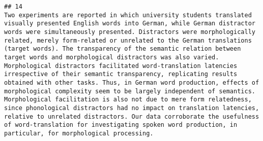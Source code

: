 \documentclass[
  english,
  man]{apa6}
\begin{document}
\begin{verbatim}
## 14                                                                                                                                                                                                                                                                                                                                                                                                                                                                                                                                                                                                                                                                                                                                                                                                                                                                                                                                                                                                                                                                                                                                                                                                                                                                                                                                                                                                                                                                                                                                                                                                                                          Two experiments are reported in which university students translated visually presented English words into German, while German distractor words were simultaneously presented. Distractors were morphologically related, merely form-related or unrelated to the German translations (target words). The transparency of the semantic relation between target words and morphological distractors was also varied. Morphological distractors facilitated word-translation latencies irrespective of their semantic transparency, replicating results obtained with other tasks. Thus, in German word production, effects of morphological complexity seem to be largely independent of semantics. Morphological facilitation is also not due to mere form relatedness, since phonological distractors had no impact on translation latencies, relative to unrelated distractors. Our data corroborate the usefulness of word-translation for investigating spoken word production, in particular, for morphological processing.

\end{verbatim}
\end{document}
